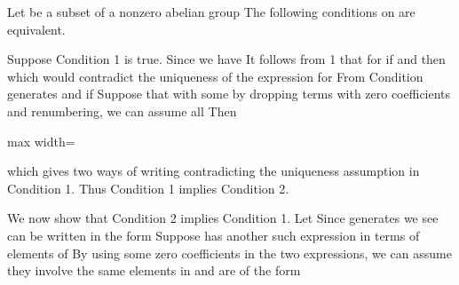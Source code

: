 \documentclass[11pt,oneside]{article}
\begin{document}
\begin{BookBody}
 Let  be a subset of a nonzero abelian group  The following conditions on  are equivalent.



 Suppose Condition 1 is true. Since  we have  It follows from 1 that  for if  and  then  which would contradict the uniqueness of the expression for  From Condition  generates  and   if  Suppose that  with some  by dropping terms with zero coefficients and renumbering, we can assume all  Then

\begin{center}\begin{adjustbox}{max width=\linewidth}\end{adjustbox}\end{center}

\noindent which gives two ways of writing  contradicting the uniqueness assumption in Condition 1. Thus Condition 1 implies Condition 2.

We now show that Condition 2 implies Condition 1. Let  Since  generates  we see  can be written in the form  Suppose  has another such expression in terms of elements of  By using some zero coefficients in the two expressions, we can assume they involve the same elements in  and are of the form

\end{BookBody}
\end{document}
